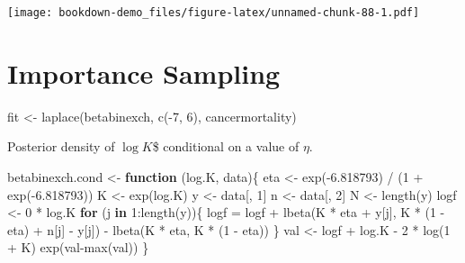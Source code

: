 \documentclass[
]{book}
\newenvironment{Shaded}{\begin{snugshade}}{\end{snugshade}}
\newcommand{\ControlFlowTok}[1]{\textcolor[rgb]{0.13,0.29,0.53}{\textbf{#1}}}
\newcommand{\DecValTok}[1]{\textcolor[rgb]{0.00,0.00,0.81}{#1}}
\newcommand{\FloatTok}[1]{\textcolor[rgb]{0.00,0.00,0.81}{#1}}
\newcommand{\FunctionTok}[1]{\textcolor[rgb]{0.00,0.00,0.00}{#1}}
\newcommand{\NormalTok}[1]{#1}
\newcommand{\OtherTok}[1]{\textcolor[rgb]{0.56,0.35,0.01}{#1}}
\newcommand{\SpecialCharTok}[1]{\textcolor[rgb]{0.00,0.00,0.00}{#1}}
\begin{document}
\texttt{[image: bookdown-demo\_files/figure-latex/unnamed-chunk-88-1.pdf]}

\hypertarget{importance-sampling}{%
\section{Importance Sampling}\label{importance-sampling}}

\begin{Shaded}
\begin{Highlighting}[]
\NormalTok{fit }\OtherTok{\textless{}{-}} \FunctionTok{laplace}\NormalTok{(betabinexch,}
               \FunctionTok{c}\NormalTok{(}\SpecialCharTok{{-}}\DecValTok{7}\NormalTok{, }\DecValTok{6}\NormalTok{),}
\NormalTok{               cancermortality)}
\end{Highlighting}
\end{Shaded}

Posterior density of \(\log K\)\$ conditional on a value of \(\eta\).

\begin{Shaded}
\begin{Highlighting}[]
\NormalTok{betabinexch.cond }\OtherTok{\textless{}{-}} \ControlFlowTok{function}\NormalTok{ (log.K, data)\{}
\NormalTok{  eta }\OtherTok{\textless{}{-}} \FunctionTok{exp}\NormalTok{(}\SpecialCharTok{{-}}\FloatTok{6.818793}\NormalTok{) }\SpecialCharTok{/}\NormalTok{ (}\DecValTok{1} \SpecialCharTok{+} \FunctionTok{exp}\NormalTok{(}\SpecialCharTok{{-}}\FloatTok{6.818793}\NormalTok{))}
\NormalTok{  K }\OtherTok{\textless{}{-}} \FunctionTok{exp}\NormalTok{(log.K)}
\NormalTok{  y }\OtherTok{\textless{}{-}}\NormalTok{ data[, }\DecValTok{1}\NormalTok{]}
\NormalTok{  n }\OtherTok{\textless{}{-}}\NormalTok{ data[, }\DecValTok{2}\NormalTok{]}
\NormalTok{  N }\OtherTok{\textless{}{-}} \FunctionTok{length}\NormalTok{(y)}
\NormalTok{  logf }\OtherTok{\textless{}{-}} \DecValTok{0} \SpecialCharTok{*}\NormalTok{ log.K}
  \ControlFlowTok{for}\NormalTok{ (j }\ControlFlowTok{in} \DecValTok{1}\SpecialCharTok{:}\FunctionTok{length}\NormalTok{(y))\{}
\NormalTok{     logf }\OtherTok{=}\NormalTok{ logf }\SpecialCharTok{+} \FunctionTok{lbeta}\NormalTok{(K }\SpecialCharTok{*}\NormalTok{ eta }\SpecialCharTok{+}\NormalTok{ y[j], }
\NormalTok{                 K }\SpecialCharTok{*}\NormalTok{ (}\DecValTok{1} \SpecialCharTok{{-}}\NormalTok{ eta) }\SpecialCharTok{+}\NormalTok{ n[j] }\SpecialCharTok{{-}}\NormalTok{ y[j]) }\SpecialCharTok{{-}}
                \FunctionTok{lbeta}\NormalTok{(K }\SpecialCharTok{*}\NormalTok{ eta, K }\SpecialCharTok{*}\NormalTok{ (}\DecValTok{1} \SpecialCharTok{{-}}\NormalTok{ eta))}
\NormalTok{  \}}
\NormalTok{  val }\OtherTok{\textless{}{-}}\NormalTok{ logf }\SpecialCharTok{+}\NormalTok{ log.K }\SpecialCharTok{{-}} \DecValTok{2} \SpecialCharTok{*} \FunctionTok{log}\NormalTok{(}\DecValTok{1} \SpecialCharTok{+}\NormalTok{ K)}
  \FunctionTok{exp}\NormalTok{(val}\SpecialCharTok{{-}}\FunctionTok{max}\NormalTok{(val))}
\NormalTok{\}}
\end{Highlighting}
\end{Shaded}
\end{document}
